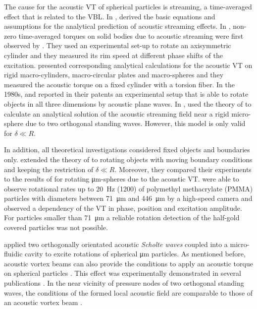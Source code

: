 The cause for the acoustic VT of spherical particles is streaming, a 
time-averaged effect that is related to the VBL. In 
\citeyear{Nyborg1958}, \citeauthor{Nyborg1958} \cite{Nyborg1958} derived the basic equations 
and assumptions for the analytical prediction of acoustic streaming effects. In 
\citeyear{Rudnick1977}, non-zero time-averaged torques on solid bodies due to 
acoustic streaming were first observed by \citeauthor{Rudnick1977} \cite{Rudnick1977}. 
They used an experimental set-up to rotate an axisymmetric cylinder and they 
measured its rim speed at different phase shifts of the excitation.  
\citeauthor{Busse1981} \cite{Busse1981} presented corresponding analytical calculations 
for the acoustic VT on rigid macro-cylinders, macro-circular plates and 
macro-spheres and they measured the acoustic torque on a fixed cylinder with a 
torsion fiber. In the 1980s, \citeauthor{Barmatz1983} \cite{Barmatz1983,Barmatz1989} and 
\citeauthor{Elleman1983} \cite{Elleman1983} reported in their patents an experimental setup 
that is able to rotate objects in all three dimensions by acoustic plane waves.  
In \citeyear{Wang1989}, \citeauthor{Wang1989} \cite{Wang1989} used the theory of 
\citeauthor{Nyborg1958} to calculate an analytical solution of the acoustic 
streaming field near a rigid micro-sphere due to two orthogonal standing waves.  
However, this model is only valid for $\delta \ll R$.

In addition, all theoretical investigations considered fixed objects and 
boundaries only.  \citeauthor{Lamprecht2013} \cite{Lamprecht2013} extended the theory of 
\citeauthor{Nyborg1958} to rotating objects with moving boundary conditions and 
keeping the restriction of $\delta \ll R$. Moreover, they compared their 
experiments to the results of \citeauthor{Wang1989} for rotating 
\si{\micro\meter}-spheres due to the acoustic VT\@.  \citeauthor{Lamprecht2013} were 
able to observe rotational rates up to \SI{20}{\hertz} (\SI{1200}{\rpm}) of 
polymethyl methacrylate (PMMA) particles with diameters between 
\SI{71}{\micro\meter} and \SI{446}{\micro\meter} by a high-speed camera and 
observed a dependency of the VT in phase, position and excitation amplitude.  
For particles smaller than \SI{71}{\micro\meter} a reliable rotation detection 
of the half-gold covered particles was not possible.

\citeauthor{Aubert2016} \cite{Aubert2016} applied two orthogonally 
orientated acoustic \emph{Scholte waves} \cite{Cegla2005} coupled into a 
micro-fluidic cavity to excite rotations of spherical \si{\micro\meter} 
particles. As mentioned before, acoustic vortex beams can also provide the 
conditions to apply an acoustic torque on spherical particles 
\cite{Marston2016}. This effect was experimentally demonstrated in 
several publications \cite{Hefner1999, Volke2008, 
Demore2012}. In the near vicinity of pressure nodes of two orthogonal 
standing waves, the conditions of the formed local acoustic field are comparable 
to those of an acoustic vortex beam \cite{Zhang2014}.

